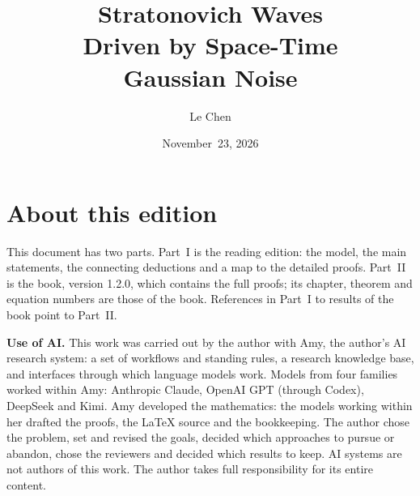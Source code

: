 \documentclass[12pt,oneside,openany]{book}
\numberwithin{equation}{section}
\theoremstyle{nogostyle}
\theoremstyle{definition}
\begin{document}
\frontmatter
\hypersetup{pageanchor=false}

\title{Stratonovich Waves\\
Driven by Space-Time\\
Gaussian Noise}
\author{Le Chen}
\date{November~23, 2026}
\maketitle
\clearpage


\chapter*{About this edition}

This document has two parts. Part~I is the reading edition: the model, the
main statements, the connecting deductions and a map to the detailed proofs.
Part~II is the book, version 1.2.0, which contains the full proofs; its
chapter, theorem and equation numbers are those of the book. References in
Part~I to results of the book point to Part~II.

\medskip
\noindent\textbf{Use of AI.} This work was carried out by the author with
Amy, the author's AI research system: a set of workflows and standing rules,
a research knowledge base, and interfaces through which language models work.
Models from four families worked within Amy: Anthropic Claude, OpenAI GPT
(through Codex), DeepSeek and Kimi. Amy developed the mathematics: the models
working within her drafted the proofs, the LaTeX source and the bookkeeping.
The author chose the problem, set and revised the goals, decided which
approaches to pursue or abandon, chose the reviewers and decided which results
to keep. AI systems are not authors of this work. The author takes full
responsibility for its entire content.
\end{document}
